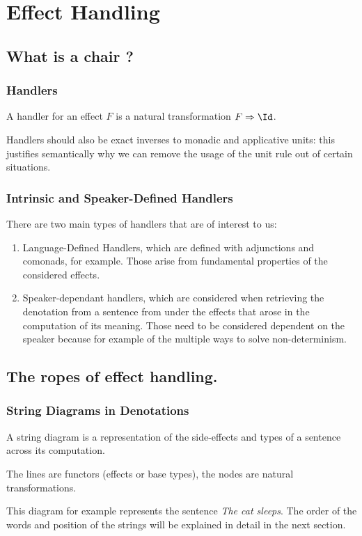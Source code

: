 \documentclass[math, english, info]{beamercours}
\begin{document}
\section{Effect Handling}
\subsection{What is a chair ?}
\begin{frame}
	\frametitle{Handlers}
	A handler for an effect $F$ is a natural transformation $F \Rightarrow \Id$.

	\smallskip

	Handlers should also be exact inverses to monadic and applicative units:
	this justifies semantically why we can remove the usage of the unit rule out
	of certain situations.
\end{frame}


\begin{frame}
	\frametitle{Intrinsic and Speaker-Defined Handlers}
	There are two main types of handlers that are of interest to us:
	\pause
	\begin{enumerate}
		\item Language-Defined Handlers, which are defined with
		      adjunctions and comonads, for example.
		      Those arise from fundamental properties of the considered effects.
		      \pause
		\item Speaker-dependant handlers, which are considered when
		      retrieving the denotation from a sentence from under the effects
		      that arose in the computation of its meaning.
		      Those need to be considered dependent on the speaker because for
		      example of the multiple ways to solve non-determinism.
	\end{enumerate}
\end{frame}

\subsection{The ropes of effect handling.}
\begin{frame}[allowframebreaks]
	\frametitle{String Diagrams in Denotations}
	A string diagram is a representation of the side-effects and types of a
	sentence across its computation.

	\smallskip

	The lines are functors (effects or base types), the nodes are natural
	transformations.

	\begin{center}
		\hfill
		\begin{minipage}[b]{.5\textwidth}
		\end{minipage}
		\hfill
		\begin{minipage}[t]{.4\textwidth}
			This diagram for example represents the sentence \textsl{The cat sleeps}.
			The order of the words and position of the strings will be explained in
			detail in the next section.
		\end{minipage}
		\hfill
	\end{center}
\end{frame}
\end{document}

